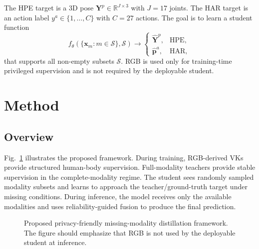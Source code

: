 \documentclass[journal]{IEEEtran}
\begin{document}
The HPE target is a 3D pose $\mathbf{Y}^{p}\in\mathbb{R}^{J\times 3}$ with $J=17$ joints. The HAR target is an action label $y^{a}\in\{1,\ldots,C\}$ with $C=27$ actions. The goal is to learn a student function
\begin{equation}
    f_{\theta}(\{\mathbf{x}_{m}:m\in\mathcal{S}\}, \mathcal{S})
    \rightarrow
    \begin{cases}
    \hat{\mathbf{Y}}^{p}, & \mathrm{HPE},\\
    \hat{\mathbf{p}}^{a}, & \mathrm{HAR},
    \end{cases}
\end{equation}
that supports all non-empty subsets $\mathcal{S}$. RGB is used only for training-time privileged supervision and is not required by the deployable student.

\section{Method}

\subsection{Overview}

Fig.~\ref{fig:framework} illustrates the proposed framework. During training, RGB-derived VKs provide structured human-body supervision. Full-modality teachers provide stable supervision in the complete-modality regime. The student sees randomly sampled modality subsets and learns to approach the teacher/ground-truth target under missing conditions. During inference, the model receives only the available modalities and uses reliability-guided fusion to produce the final prediction.

\begin{figure}[t]
    \centering
    \caption{Proposed privacy-friendly missing-modality distillation framework. The figure should emphasize that RGB is not used by the deployable student at inference.}
    \label{fig:framework}
\end{figure}
\end{document}
